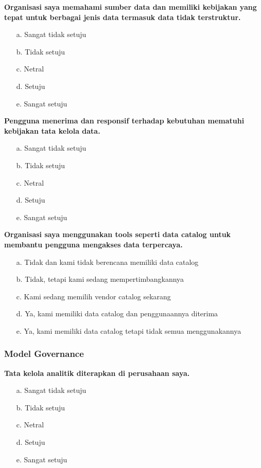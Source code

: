 \documentclass{article}
\begin{document}
\textbf{Organisasi saya memahami sumber data dan memiliki kebijakan yang tepat untuk berbagai jenis data termasuk data tidak terstruktur.}

\begin{enumerate}
	\item[a.] Sangat tidak setuju
	\item[b.] Tidak setuju
	\item[c.] Netral
	\item[d.] Setuju
	\item[e.] Sangat setuju
\end{enumerate}

\textbf{Pengguna menerima dan responsif terhadap kebutuhan mematuhi kebijakan tata kelola data.}

\begin{enumerate}
	\item[a.] Sangat tidak setuju
	\item[b.] Tidak setuju
	\item[c.] Netral
	\item[d.] Setuju
	\item[e.] Sangat setuju
\end{enumerate}

\textbf{Organisasi saya menggunakan tools seperti data catalog untuk membantu pengguna mengakses data terpercaya.}

\begin{enumerate}
	\item[a.] Tidak dan kami tidak berencana memiliki data catalog
	\item[b.] Tidak, tetapi kami sedang mempertimbangkannya
	\item[c.] Kami sedang memilih vendor catalog sekarang
	\item[d.] Ya, kami memiliki data catalog dan penggunaannya diterima
	\item[e.] Ya, kami memiliki data catalog tetapi tidak semua menggunakannya
\end{enumerate}

\subsubsection{Model Governance}

\textbf{Tata kelola analitik diterapkan di perusahaan saya.}

\begin{enumerate}
	\item[a.] Sangat tidak setuju
	\item[b.] Tidak setuju
	\item[c.] Netral
	\item[d.] Setuju
	\item[e.] Sangat setuju
\end{enumerate}
\end{document}

